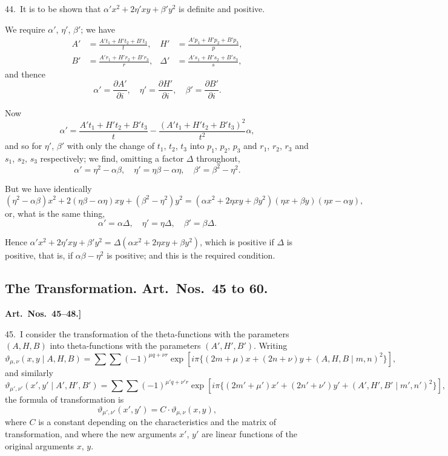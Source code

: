 \documentclass[11pt,a4paper]{book}
\begin{document}
44.\ It is to be shown that $\alpha'x^2 + 2\eta'xy + \beta'y^2$ is definite and positive.

We require $\alpha'$, $\eta'$, $\beta'$; we have
\begin{align*}
A' &= \frac{A't_1 + H't_2 + B't_3}{t}, & H' &= \frac{A'p_1 + H'p_2 + B'p_3}{p},\\
B' &= \frac{A'r_1 + H'r_2 + B'r_3}{r}, & \Delta' &= \frac{A's_1 + H's_2 + B's_3}{s},
\end{align*}
and thence
\[
\alpha' = \frac{\partial A'}{\partial i}, \quad \eta' = \frac{\partial H'}{\partial i}, \quad \beta' = \frac{\partial B'}{\partial i}.
\]

Now
\[
\alpha' = \frac{A't_1 + H't_2 + B't_3}{t} - \frac{(A't_1 + H't_2 + B't_3)^2}{t^2}\alpha,
\]
and so for $\eta'$, $\beta'$ with only the change of $t_1$, $t_2$, $t_3$ into $p_1$, $p_2$, $p_3$ and $r_1$, $r_2$, $r_3$ and $s_1$, $s_2$, $s_3$ respectively; we find, omitting a factor $\Delta$ throughout,
\[
\alpha' = \eta^2 - \alpha\beta, \quad \eta' = \eta\beta - \alpha\eta, \quad \beta' = \beta^2 - \eta^2.
\]

But we have identically
\[
(\eta^2 - \alpha\beta)x^2 + 2(\eta\beta - \alpha\eta)xy + (\beta^2 - \eta^2)y^2 = (\alpha x^2 + 2\eta xy + \beta y^2)(\eta x + \beta y)(\eta x - \alpha y),
\]
or, what is the same thing,
\[
\alpha' = \alpha\Delta, \quad \eta' = \eta\Delta, \quad \beta' = \beta\Delta.
\]

Hence $\alpha'x^2 + 2\eta'xy + \beta'y^2 = \Delta(\alpha x^2 + 2\eta xy + \beta y^2)$, which is positive if $\Delta$ is positive, that is, if $\alpha\beta - \eta^2$ is positive; and this is the required condition.

\bigskip

\subsection*{The Transformation. Art.~Nos.\ 45 to 60.}

\textbf{Art.~Nos.~45--48.]
}

45.\ I consider the transformation of the theta-functions with the parameters $(A, H, B)$ into theta-functions with the parameters $(A', H', B')$. Writing
\[
\vartheta_{\mu,\nu}(x, y \mid A, H, B) = \sum\sum (-1)^{\mu q + \nu r} \exp[i\pi\{(2m + \mu)x + (2n + \nu)y + (A, H, B \mid m, n)^2\}],
\]
and similarly
\[
\vartheta_{\mu',\nu'}(x', y' \mid A', H', B') = \sum\sum (-1)^{\mu' q + \nu' r} \exp[i\pi\{(2m' + \mu')x' + (2n' + \nu')y' + (A', H', B' \mid m', n')^2\}],
\]
the formula of transformation is
\[
\vartheta_{\mu',\nu'}(x', y') = C \cdot \vartheta_{\mu,\nu}(x, y),
\]
where $C$ is a constant depending on the characteristics and the matrix of transformation, and where the new arguments $x'$, $y'$ are linear functions of the original arguments $x$, $y$.
\end{document}

